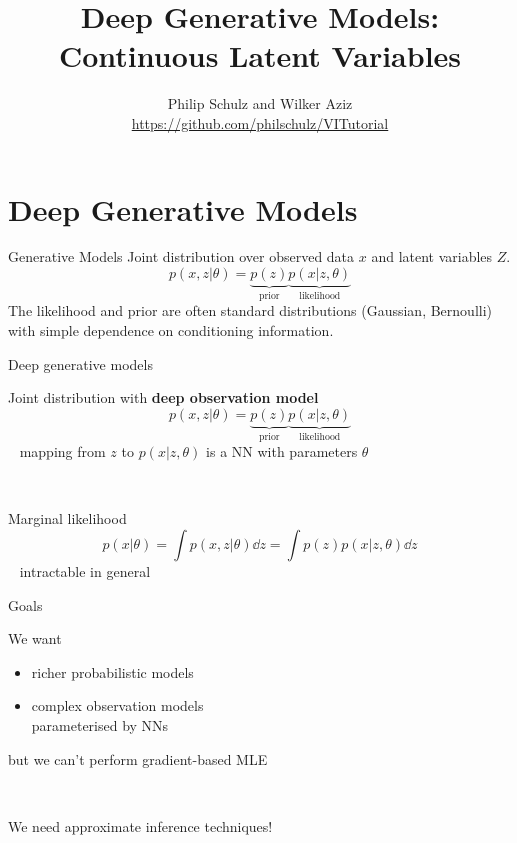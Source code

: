 \documentclass[14pt]{beamer}
\title{Deep Generative Models: \\
Continuous Latent Variables}
\author{Philip Schulz and Wilker Aziz\\
\url{https://github.com/philschulz/VITutorial}}
\date{}
\begin{document}
\begin{frame}
\maketitle
\end{frame}

\frame{\tableofcontents}

\section{Deep Generative Models}
\frame{\tableofcontents[currentsection]}

\begin{frame}{Generative Models}
Joint distribution over observed data $ x $ and latent variables $ Z $.
\begin{equation*}
p(x,z|\theta) =  \underbrace{p(z)}_{\text{prior}} \underbrace{p(x|z,\theta)}_{\text{likelihood}}
\end{equation*} 
The likelihood and prior are often standard distributions (Gaussian, Bernoulli) with simple dependence on conditioning
information.
\end{frame}

\begin{frame}{Deep generative models}

Joint distribution with {\bf deep observation model}
\begin{equation*}
p(x, z|\theta) = \underbrace{p(z)}_{\text{prior}} \underbrace{p(x|z, \theta)}_{\text{likelihood}}
\end{equation*}
~ {\small mapping from $z$ to $p(x|z, \theta)$ is a NN with parameters $\theta$}

~ \pause

Marginal likelihood 
\begin{equation*}
p(x|\theta) = \int p(x, z|\theta) \dd{z} = \int p(z)p(x|z, \theta) \dd{z} 
\end{equation*}
~ \alert{intractable} in general



\end{frame}


\begin{frame}{Goals}


We want
\begin{itemize}
	\item richer probabilistic models  \pause
	\item complex observation models \\
	parameterised by NNs 
\end{itemize}
\pause
but we can't perform gradient-based MLE

~

\pause

We need \alert{approximate inference} techniques!

\end{frame}
\end{document}
